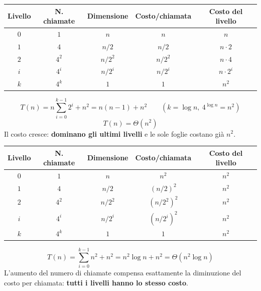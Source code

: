 \documentclass[12pt, a4paper]{article}
\begin{document}
\begin{tcolorbox}[colback=lightergray!10, colframe=tocsec, title=\textbf{Primo Caso: $T(n) = 4T(n/2)+n$}]
\label{prop:ricorrenza-caso1}
\end{tcolorbox}
\begin{center}
\begin{tabular}{ccccc}
\toprule
\textbf{Livello} & \textbf{N. chiamate} & \textbf{Dimensione} & \textbf{Costo/chiamata} & \textbf{Costo del livello} \\
\midrule
$0$ & $1$ & $n$ & $n$ & $n$ \\
$1$ & $4$ & $n/2$ & $n/2$ & $n\cdot 2$ \\
$2$ & $4^2$ & $n/2^2$ & $n/2^2$ & $n\cdot 4$ \\
$i$ & $4^i$ & $n/2^i$ & $n/2^i$ & $n\cdot 2^i$ \\
$k$ & $4^k$ & $1$ & $1$ & $n^2$ \\
\bottomrule
\end{tabular}
\end{center}
$$T(n) = n\sum_{i=0}^{k-1}2^i + n^2 = n(n-1)+n^2 \qquad (k=\log n,\ 4^{\log n}=n^2)$$
$$T(n) = \Theta(n^2)$$
Il costo cresce: \textbf{dominano gli ultimi livelli} e le sole foglie costano già $n^2$.

\begin{tcolorbox}[colback=lightergray!10, colframe=tocsec, title=\textbf{Secondo Caso: $T(n) = 4T(n/2)+n^2$}]
\label{prop:ricorrenza-caso2}
\end{tcolorbox}
\begin{center}
\begin{tabular}{ccccc}
\toprule
\textbf{Livello} & \textbf{N. chiamate} & \textbf{Dimensione} & \textbf{Costo/chiamata} & \textbf{Costo del livello} \\
\midrule
$0$ & $1$ & $n$ & $n^2$ & $n^2$ \\
$1$ & $4$ & $n/2$ & $(n/2)^2$ & $n^2$ \\
$2$ & $4^2$ & $n/2^2$ & $(n/2^2)^2$ & $n^2$ \\
$i$ & $4^i$ & $n/2^i$ & $(n/2^i)^2$ & $n^2$ \\
$k$ & $4^k$ & $1$ & $1$ & $n^2$ \\
\bottomrule
\end{tabular}
\end{center}
$$T(n) = \sum_{i=0}^{k-1} n^2 + n^2 = n^2\log n + n^2 = \Theta(n^2\log n)$$
L'aumento del numero di chiamate compensa esattamente la diminuzione del costo per chiamata: \textbf{tutti i livelli hanno lo stesso costo}.
\end{document}
